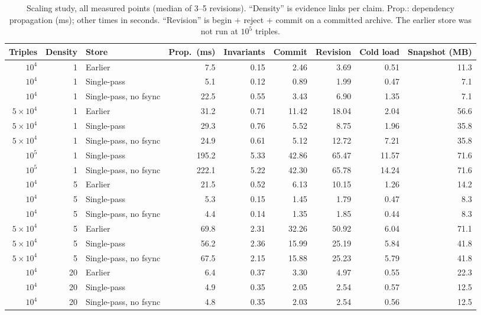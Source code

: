 \documentclass[journal]{IEEEtran}
\begin{document}
\begin{table}[!t]
\centering
\caption{Scaling study, all measured points (median of 3--5 revisions). ``Density'' is evidence links per claim. Prop.: dependency propagation (ms); other times in seconds. ``Revision'' is begin + reject + commit on a committed archive. The earlier store was not run at $10^5$ triples.}
\label{tab:scaling_full}
\scriptsize
\begin{tabular}{rrlrrrrrr}
\toprule
Triples & Density & Store & Prop.\ (ms) & Invariants & Commit & Revision & Cold load & Snapshot (MB) \\
\midrule
$10^4$ & 1 & Earlier & 7.5 & 0.15 & 2.46 & 3.69 & 0.51 & 11.3 \\
$10^4$ & 1 & Single-pass & 5.1 & 0.12 & 0.89 & 1.99 & 0.47 & 7.1 \\
$10^4$ & 1 & Single-pass, no fsync & 22.5 & 0.55 & 3.43 & 6.90 & 1.35 & 7.1 \\
$5{\times}10^4$ & 1 & Earlier & 31.2 & 0.71 & 11.42 & 18.04 & 2.04 & 56.6 \\
$5{\times}10^4$ & 1 & Single-pass & 29.3 & 0.76 & 5.52 & 8.75 & 1.96 & 35.8 \\
$5{\times}10^4$ & 1 & Single-pass, no fsync & 24.9 & 0.61 & 5.12 & 12.72 & 7.21 & 35.8 \\
$10^5$ & 1 & Single-pass & 195.2 & 5.33 & 42.86 & 65.47 & 11.57 & 71.6 \\
$10^5$ & 1 & Single-pass, no fsync & 222.1 & 5.22 & 42.30 & 65.78 & 14.24 & 71.6 \\
$10^4$ & 5 & Earlier & 21.5 & 0.52 & 6.13 & 10.15 & 1.26 & 14.2 \\
$10^4$ & 5 & Single-pass & 5.3 & 0.15 & 1.45 & 1.79 & 0.47 & 8.3 \\
$10^4$ & 5 & Single-pass, no fsync & 4.4 & 0.14 & 1.35 & 1.85 & 0.44 & 8.3 \\
$5{\times}10^4$ & 5 & Earlier & 69.8 & 2.31 & 32.26 & 50.92 & 6.04 & 71.1 \\
$5{\times}10^4$ & 5 & Single-pass & 56.2 & 2.36 & 15.99 & 25.19 & 5.84 & 41.8 \\
$5{\times}10^4$ & 5 & Single-pass, no fsync & 67.5 & 2.15 & 15.88 & 25.23 & 5.79 & 41.8 \\
$10^4$ & 20 & Earlier & 6.4 & 0.37 & 3.30 & 4.97 & 0.55 & 22.3 \\
$10^4$ & 20 & Single-pass & 4.9 & 0.35 & 2.05 & 2.54 & 0.57 & 12.5 \\
$10^4$ & 20 & Single-pass, no fsync & 4.8 & 0.35 & 2.03 & 2.54 & 0.56 & 12.5 \\
\bottomrule
\end{tabular}
\end{table}
\end{document}
